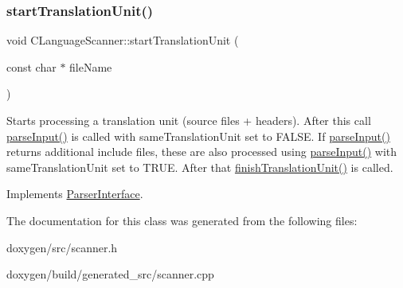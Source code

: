 \mbox{\label{class_c_language_scanner_a8b667ac29ed52d3374f0df39a63d4c73}} 
\subsubsection{\texorpdfstring{startTranslationUnit()}{startTranslationUnit()}}
{\footnotesize\ttfamily void C\+Language\+Scanner\+::start\+Translation\+Unit (\begin{DoxyParamCaption}\item[{const char $\ast$}]{file\+Name }\end{DoxyParamCaption})\hspace{0.3cm}{\ttfamily [virtual]}}

Starts processing a translation unit (source files + headers). After this call \mbox{\hyperlink{class_c_language_scanner_a0a92c2f77d7b78987e8dad149a2f4171}{parse\+Input()}} is called with same\+Translation\+Unit set to F\+A\+L\+SE. If \mbox{\hyperlink{class_c_language_scanner_a0a92c2f77d7b78987e8dad149a2f4171}{parse\+Input()}} returns additional include files, these are also processed using \mbox{\hyperlink{class_c_language_scanner_a0a92c2f77d7b78987e8dad149a2f4171}{parse\+Input()}} with same\+Translation\+Unit set to T\+R\+UE. After that \mbox{\hyperlink{class_c_language_scanner_a03f5004bda27f5c73f3b9d74d9064b99}{finish\+Translation\+Unit()}} is called. 

Implements \mbox{\hyperlink{class_parser_interface_a72478f87ead5fde10d7d6bbe32a73024}{Parser\+Interface}}.



The documentation for this class was generated from the following files\+:\begin{DoxyCompactItemize}
\item 
doxygen/src/scanner.\+h\item 
doxygen/build/generated\+\_\+src/scanner.\+cpp\end{DoxyCompactItemize}
